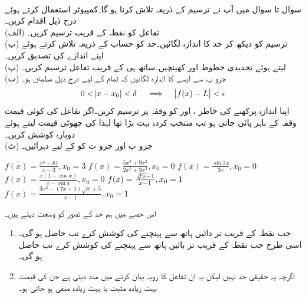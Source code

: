 \\
سوال  تا سوال  میں آپ نے ترسیم کے ذریعہ  تلاش کرنا ہو گا۔کمپیوٹر استعمال کرتے ہوئے درج ذیل اقدام کریں۔\\
(الف) \quad
تفاعل  کو نقطہ  کے قریب ترسیم کریں۔\\
(ب) \quad
ترسیم کو دیکھ کر حد کا اندازہ لگائیں۔حد کو حساب کے ذریعہ تلاش کرتے ہوئے اپنے اندازے کی تصدیق کریں۔\\
(پ)\quad
{} لیتے ہوئے تحدیدی خطوط  اور  کھینچیں۔ساتھ ہی  کے قریب تفاعل  ترسیم  کریں۔\\
(ت) \quad
جزو  پ سے ایسے  کا اندازہ لگائیں کہ تمام  کے لیے درج ذیل مطمئن   ہو۔
\begin{align*}
0<\abs{x-x_0}<\delta\quad \implies \quad \abs{f(x)-L}<\epsilon
\end{align*}
اپنا اندازہ پرکھنے کی خاطر ،  اور  کو وقفہ  پر ترسیم کریں۔اگر تفاعل کی کوئی قیمت وقفہ  کے باہر پائی جاتی ہو تب منتخب کردہ بہت بڑا تھا لہٰذا  کی چھوٹی قیمت لیتے ہوئے دوبارہ کوشش کریں۔ \\
(ٹ)\quad
جزو پ اور   جزو  ت کو  کے لیے دہرائیں۔

$f(x)=\tfrac{x^4-81}{x-3}, x_0=3$
$f(x)=\tfrac{5x^3+9x^2}{2x^5+3x^2}, x_0=0$
$f(x)=\tfrac{\sin 2x}{3x}, x_0=0$
$f(x)=\tfrac{x(1-\cos x)}{x-\sin x}, x_0=0$
$f(x)=\tfrac{\sqrt[\leftroot{-2}3]{x}-1}{x-1}, x_0=1$
$f(x)=\tfrac{3x^2-(7x+1)\sqrt{x}+5}{x-1}, x_0=1$


اس حصے میں ہم حد کے  تصور کو وسعت دیتے ہیں۔
\begin{enumerate}[1.]
\item
{}  جب  نقطہ   کے قریب تر دائیں ہاتھ سے پہنچنے کی کوشش کرے تب  حاصل ہو گی۔ اسی طرح جب  نقطہ   کے قریب تر  بائیں ہاتھ سے پہنچنے کی کوشش کرے تب  حاصل ہو گی۔
\item
{} اگرچہ یہ حقیقی حد نہیں  لیکن یہ ان تفاعل کا رویہ بیان کرنے میں مدد دیتی ہے جن کی قیمت بہت زیادہ مثبت یا  بہت زیادہ منفی ہو جاتی ہو۔  
\end{enumerate}

